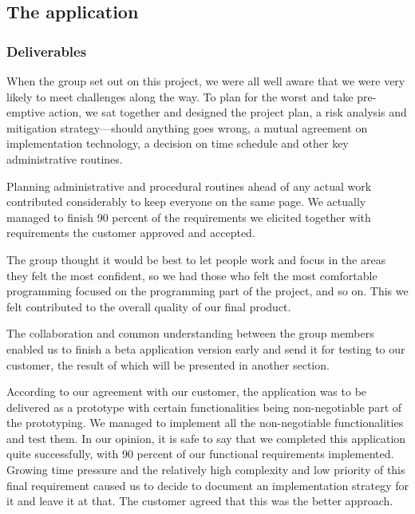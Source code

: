 \subsection{The application}
	
    \subsubsection{Deliverables}
    When the group set out on this project, we were all well aware that we were very likely to meet challenges along the way. To plan for the worst and take pre-emptive action, we sat together and designed the project plan, a risk analysis and mitigation strategy---should anything goes wrong, a mutual agreement on implementation technology, a decision on time schedule and other key administrative routines.

    Planning administrative and procedural routines ahead of any actual work contributed considerably to keep everyone on the same page. We actually managed to finish 90 percent of the requirements we elicited together with requirements the customer approved and accepted.

    The group thought it would be best to let people work and focus in the areas they felt the most confident, so we had those who felt the most comfortable programming focused on the programming part of the project, and so on. This we felt contributed to the overall quality of our final product. 

    The collaboration and common understanding between the group members enabled us to finish a beta application version early and send it for testing to our customer, the result of which will be presented in another section.

    According to our agreement with our customer, the application was to be delivered as a prototype with certain functionalities being non-negotiable part of the prototyping. We managed to implement all the non-negotiable functionalities and test them. In our opinion, it is safe to say that we completed this application quite successfully, with 90 percent of our functional requirements implemented. Growing time pressure and the relatively high complexity and low priority of this final requirement caused us to decide to document an implementation strategy for it and leave it at that. The customer agreed that this was the better approach.

